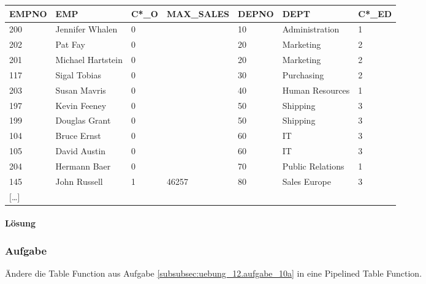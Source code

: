 \begin{table}[H]
  \centering
  \small
  \ttfamily
  \begin{tabular}{|l|l|l|l|l|l|l|}
    \hline
    \textbf{EMPNO}& \textbf{EMP}     & \textbf{C*\_O} & \textbf{MAX\_SALES} & \textbf{DEPNO} & \textbf{DEPT} & \textbf{C*\_ED} \\
    \hline
     200         & Jennifer Whalen   & 0     &            & 10    & Administration   & 1 \\
     202         & Pat Fay           & 0     &            & 20    & Marketing        & 2 \\
     201         & Michael Hartstein & 0     &            & 20    & Marketing        & 2 \\
     117         & Sigal Tobias      & 0     &            & 30    & Purchasing       & 2 \\
     203         & Susan Mavris      & 0     &            & 40    & Human Resources  & 1 \\
     197         & Kevin Feeney      & 0     &            & 50    & Shipping         & 3 \\
     199         & Douglas Grant     & 0     &            & 50    & Shipping         & 3 \\
     104         & Bruce Ernst       & 0     &            & 60    & IT               & 3 \\
     105         & David Austin      & 0     &            & 60    & IT               & 3 \\
     204         & Hermann Baer      & 0     &            & 70    & Public Relations & 1 \\
     145         & John Russell      & 1     & 46257      & 80    & Sales Europe     & 3 \\
     $[$\dots$]$ &                   &       &            &       &                  & \\
     \hline
  \end{tabular}
\end{table}

\paragraph*{Lösung}
\label{subsubsec:uebung_12.aufgabe_10a.loesung}

\subsubsection{Aufgabe}
\label{subsec:uebung_12.aufgabe_10b}
Ändere die Table Function aus Aufgabe \ref{subsubsec:uebung_12.aufgabe_10a} in eine Pipelined Table Function.

